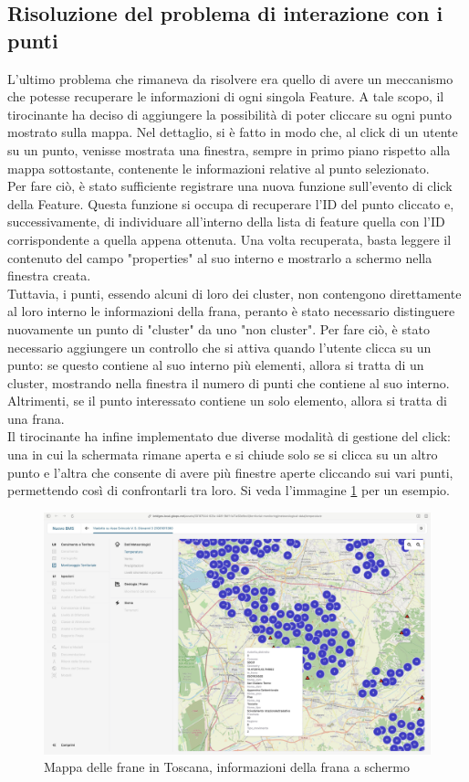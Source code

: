 \subsection{Risoluzione del problema di interazione con i punti}

L'ultimo problema che rimaneva da risolvere era quello di avere un meccanismo che potesse recuperare le informazioni di ogni singola Feature. A tale scopo, il tirocinante ha deciso di aggiungere la possibilità di poter cliccare su ogni punto mostrato sulla mappa. Nel dettaglio, si è fatto in modo che, al click di un utente su un punto, venisse mostrata una finestra, sempre in primo piano rispetto alla mappa sottostante, contenente le informazioni relative al punto selezionato.
\\Per fare ciò, è stato sufficiente registrare una nuova funzione sull'evento di click della Feature. Questa funzione si occupa di recuperare l'ID del punto cliccato e, successivamente, di individuare all'interno della lista di feature quella con l'ID corrispondente a quella appena ottenuta. Una volta recuperata, basta leggere il contenuto del campo "properties" al suo interno e mostrarlo a schermo nella finestra creata.
\\Tuttavia, i punti, essendo alcuni di loro dei cluster, non contengono direttamente al loro interno le informazioni della frana, peranto è stato necessario distinguere nuovamente un punto di "cluster" da uno "non cluster". Per fare ciò, è stato necessario aggiungere un controllo che si attiva quando l'utente clicca su un punto: se questo contiene al suo interno più elementi, allora si tratta di un cluster, mostrando nella finestra il numero di punti che contiene al suo interno. Altrimenti, se il punto interessato contiene un solo elemento, allora si tratta di una frana.
\\Il tirocinante ha infine implementato due diverse modalità di gestione del click: una in cui la schermata rimane aperta e si chiude solo se si clicca su un altro punto e l'altra che consente di avere più finestre aperte cliccando sui vari punti, permettendo così di confrontarli tra loro. Si veda l'immagine \ref{fig:toscanaClickGeoJSON} per un esempio.
\begin{figure}[htbp]
      \centering
      \includegraphics[width=1\textwidth]{Tesi/images/Capitolo4/toscanaClickGeoJSON.jpeg}
      \caption{Mappa delle frane in Toscana, informazioni della frana a schermo}
      \label{fig:toscanaClickGeoJSON}
\end{figure}

